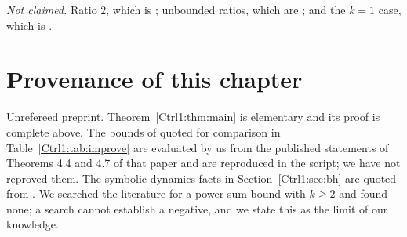 \emph{Not claimed.} Ratio $2$, which is \cite{BF99}; unbounded ratios, which are
\cite{NM03}; and the $k=1$ case, which is \cite{Ben20ELA}.

\section*{Provenance of this chapter}

Unrefereed preprint. Theorem~\ref{Ctrl1:thm:main} is elementary and its proof is complete above.
The bounds of \cite{Ben20ELA} quoted for comparison in Table~\ref{Ctrl1:tab:improve} are
evaluated by us from the published statements of Theorems 4.4 and 4.7 of that paper and are
reproduced in the script; we have not reproved them. The symbolic-dynamics facts in
Section~\ref{Ctrl1:sec:bh} are quoted from \cite{LM95,BH91,KOR00}. We searched the literature for
a power-sum bound with $k\ge2$ and found none; a search cannot establish a negative, and we
state this as the limit of our knowledge.
